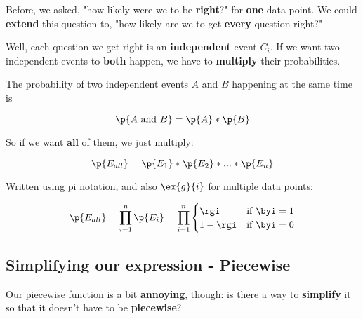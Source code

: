         Before, we asked, "how likely were we to be \textbf{right}?" for \textbf{one} data point. We could \textbf{extend} this question to, "how likely are we to get \textbf{every} question right?"
        
        Well, each question we get right is an \textbf{independent} event $C_i$. If we want two independent events to \textbf{both} happen, we have to \textbf{multiply} their probabilities.\\
        
        \begin{kequation}
            The probability of two independent events $A$ and $B$ happening at the same time is
            
            \begin{equation*}
                \p{A \text{ and } B} = \p{A} * \p{B}
            \end{equation*}
        \end{kequation}

        
        So if we want \textbf{all} of them, we just multiply:
        
        \begin{equation}
            \p{E_{all}} = \p{E_1} * \p{E_2} * ...
            * \p{E_n}
        \end{equation}
        
        Written using pi notation, and also $\ex{g}{i}$ for multiple data points:
            
        \begin{equation}
            \p{E_{all}} = \prod_{i = 1}^n \p{E_i} = \prod_{i = 1}^n \begin{cases}
                \rgi & 
                \text{if } \byi=1 \\
                1-\rgi & 
                \text{if } \byi=0
            \end{cases}
        \end{equation}
        
    \subsection*{Simplifying our expression - Piecewise}
        
        Our piecewise function is a bit \textbf{annoying}, though: is there a way to \textbf{simplify} it so that it doesn't have to be \textbf{piecewise}?
        
